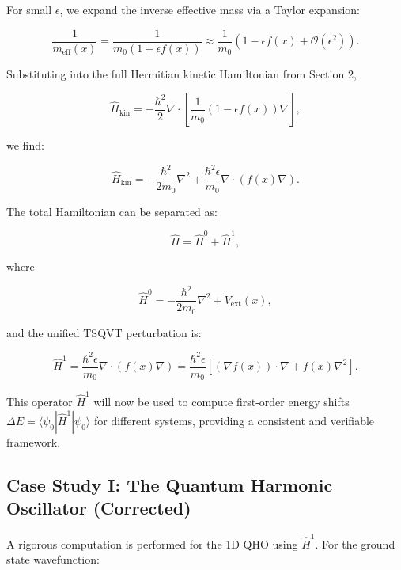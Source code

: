 \documentclass[a4paper]{article}
\begin{document}
For small \( \epsilon \), we expand the inverse effective mass via a Taylor expansion:

\begin{equation}
	\frac{1}{m_{\text{eff}}(x)} = \frac{1}{m_0 (1 + \epsilon f(x))} \approx \frac{1}{m_0} \left( 1 - \epsilon f(x) + \mathcal{O}(\epsilon^2) \right).
\end{equation}

Substituting into the full Hermitian kinetic Hamiltonian from Section 2,

\begin{equation}
	\hat{H}_{\text{kin}} = -\frac{\hbar^2}{2} \nabla \cdot \left[ \frac{1}{m_0} (1 - \epsilon f(x)) \nabla \right],
\end{equation}

we find:

\begin{equation}
	\hat{H}_{\text{kin}} = -\frac{\hbar^2}{2m_0} \nabla^2 + \frac{\hbar^2 \epsilon}{m_0} \nabla \cdot (f(x) \nabla).
\end{equation}

The total Hamiltonian can be separated as:

\begin{equation}
	\hat{H} = \hat{H}^0 + \hat{H}^1,
\end{equation}

where

\begin{equation}
	\hat{H}^0 = -\frac{\hbar^2}{2m_0} \nabla^2 + V_{\text{ext}}(x),
\end{equation}

and the unified TSQVT perturbation is:

\begin{equation}
	\hat{H}^1 = \frac{\hbar^2 \epsilon}{m_0} \nabla \cdot (f(x) \nabla) = \frac{\hbar^2 \epsilon}{m_0} \left[ (\nabla f(x)) \cdot \nabla + f(x) \nabla^2 \right].
\end{equation}

This operator \( \hat{H}^1 \) will now be used to compute first-order energy shifts \( \Delta E = \langle \psi_0 | \hat{H}^1 | \psi_0 \rangle \) for different systems, providing a consistent and verifiable framework.

\subsection{Case Study I: The Quantum Harmonic Oscillator (Corrected)}

A rigorous computation is performed for the 1D QHO using \( \hat{H}^1 \). For the ground state wavefunction:
\end{document}

